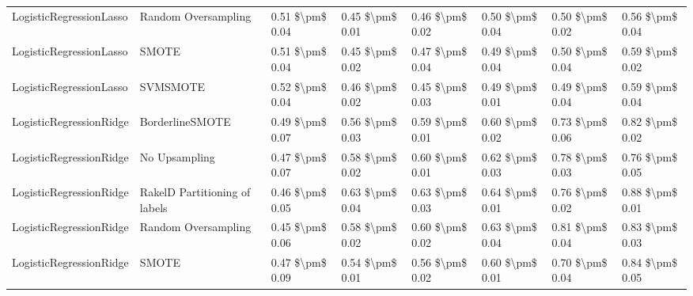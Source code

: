 \begin{tabular}{llllllll}
        LogisticRegressionLasso &           Random Oversampling &     0.51 \$\textbackslash pm\$ 0.04 &           0.45 \$\textbackslash pm\$ 0.01 &       0.46 \$\textbackslash pm\$ 0.02 &        0.50 \$\textbackslash pm\$ 0.04 &                         0.50 \$\textbackslash pm\$ 0.02 & 0.56 \$\textbackslash pm\$ 0.04 \\
        LogisticRegressionLasso &                         SMOTE &     0.51 \$\textbackslash pm\$ 0.04 &           0.45 \$\textbackslash pm\$ 0.02 &       0.47 \$\textbackslash pm\$ 0.04 &        0.49 \$\textbackslash pm\$ 0.04 &                         0.50 \$\textbackslash pm\$ 0.04 & 0.59 \$\textbackslash pm\$ 0.02 \\
        LogisticRegressionLasso &                      SVMSMOTE &     0.52 \$\textbackslash pm\$ 0.04 &           0.46 \$\textbackslash pm\$ 0.02 &       0.45 \$\textbackslash pm\$ 0.03 &        0.49 \$\textbackslash pm\$ 0.01 &                         0.49 \$\textbackslash pm\$ 0.04 & 0.59 \$\textbackslash pm\$ 0.04 \\
        LogisticRegressionRidge &               BorderlineSMOTE &     0.49 \$\textbackslash pm\$ 0.07 &           0.56 \$\textbackslash pm\$ 0.03 &       0.59 \$\textbackslash pm\$ 0.01 &        0.60 \$\textbackslash pm\$ 0.02 &                         0.73 \$\textbackslash pm\$ 0.06 & 0.82 \$\textbackslash pm\$ 0.02 \\
        LogisticRegressionRidge &                 No Upsampling &     0.47 \$\textbackslash pm\$ 0.07 &           0.58 \$\textbackslash pm\$ 0.02 &       0.60 \$\textbackslash pm\$ 0.01 &        0.62 \$\textbackslash pm\$ 0.03 &                         0.78 \$\textbackslash pm\$ 0.03 & 0.76 \$\textbackslash pm\$ 0.05 \\
        LogisticRegressionRidge & RakelD Partitioning of labels &     0.46 \$\textbackslash pm\$ 0.05 &           0.63 \$\textbackslash pm\$ 0.04 &       0.63 \$\textbackslash pm\$ 0.03 &        0.64 \$\textbackslash pm\$ 0.01 &                         0.76 \$\textbackslash pm\$ 0.02 & 0.88 \$\textbackslash pm\$ 0.01 \\
        LogisticRegressionRidge &           Random Oversampling &     0.45 \$\textbackslash pm\$ 0.06 &           0.58 \$\textbackslash pm\$ 0.02 &       0.60 \$\textbackslash pm\$ 0.02 &        0.63 \$\textbackslash pm\$ 0.04 &                         0.81 \$\textbackslash pm\$ 0.04 & 0.83 \$\textbackslash pm\$ 0.03 \\
        LogisticRegressionRidge &                         SMOTE &     0.47 \$\textbackslash pm\$ 0.09 &           0.54 \$\textbackslash pm\$ 0.01 &       0.56 \$\textbackslash pm\$ 0.02 &        0.60 \$\textbackslash pm\$ 0.01 &                         0.70 \$\textbackslash pm\$ 0.04 & 0.84 \$\textbackslash pm\$ 0.05 \\

\end{tabular}
